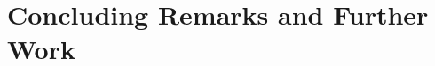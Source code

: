 \documentclass[runningheads]{llncs}
\begin{document}
\section{Concluding Remarks and Further Work}  
%
%
%
%
%
%
\end{document}

